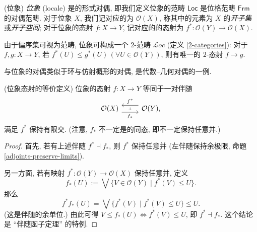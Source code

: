 \begin{definition}
	[label={locale-definition}]
	{(位象)}
	\emph{位象} (locale) 是\fm{}的形式对偶,
	即我们定义位象的范畴 $\mathsf {Loc}$ 是位格范畴 $\mathsf {Frm}$ 的对偶范畴.
	对于位象 $X$, 我们记对应的\fm{}为 $\mathcal O(X)$, 称其中的元素为 $X$ 的\emph{开子集}或\emph{开子空间}; 对于位象的态射 $f \colon X \to Y$,
	记对应的\fm{}的态射为 $f^* \colon \mathcal O(Y) \to \mathcal O(X)$.
	
	由于偏序集可视为范畴, 位象可构成一个 $2$-范畴 $\mathcal Loc$ (定义 \ref{2-categories}): 对于 $f,g\colon X\to Y$, 若 $f^*(U)\leq g^*(U)\,(\forall U\in\mathcal O(Y))$, 则有唯一的 $2$-态射 $f\to g$.
\end{definition}

\begin{remark}
	{}
	\fm{}与位象的对偶类似于环与仿射概形的对偶,
	是代数--几何对偶的一例.
\end{remark}

\begin{prop}
	[label={morphism-of-locales-as-adjunction}]
	{(位象态射的等价定义)}
	位象的态射 $f\colon X\to Y$ 等同于一对伴随\footnotemark{}
	\[\begin{tikzcd}[ampersand replacement=\&]
		{\mathcal O(X)} \& {\mathcal O(Y),}
		\arrow[""{name=0, anchor=center, inner sep=0}, "{f^*}"', shift right=2, from=1-2, to=1-1]
		\arrow[""{name=1, anchor=center, inner sep=0}, "{f_*}"', shift right=2, from=1-1, to=1-2]
		\arrow["\dashv"{anchor=center, rotate=-90}, draw=none, from=0, to=1]
	\end{tikzcd}\]
	满足 $f^*$ 保持有限交. (注意, $f_*$ 不一定是\fm{}的同态, 即不一定保持任意并.)
\end{prop}
\begin{proof}
	首先, 若有上述伴随 $f^*\dashv f_*$, 则 $f^*$ 保持任意并 (左伴随保持余极限, 命题 \ref{adjoints-preserve-limits}).
	
	另一方面, 若有映射 $f^*\colon \mathcal O(Y)\to\mathcal O(X)$ 保持任意并, 定义
	\[
	f_*(U) := \bigvee \{V\in\mathcal O(Y)\mid f^*(V)\leq U\}.
	\]
	那么
	\[
	f^*f_*(U) = \bigvee \{f^*(V)\mid f^*(V)\leq U\} \leq U.
	\]
	(这是伴随的余单位.)
	由此可得 $V\leq f_*(U) \Leftrightarrow f^*(V)\leq U$, 即 $f^*\dashv f_*$. 这个结论是 ``伴随函子定理'' 的特例.
\end{proof}

